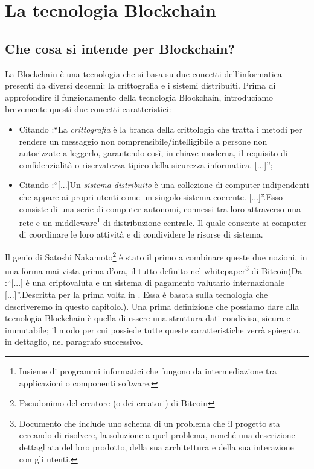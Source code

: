 
\chapter{La tecnologia Blockchain}\makeatletter{}\makeatother
\label{cap1}
\section{Che cosa si intende per Blockchain?}\label{Capitolo1.1}
La Blockchain è una tecnologia che si basa su due concetti dell'informatica presenti da diversi decenni: la crittografia e i sistemi distribuiti.
Prima di approfondire il funzionamento della tecnologia Blockchain, introduciamo brevemente questi due concetti caratteristici:

\begin{itemize}
    \item Citando \cite{crittografia_definizione}:“La \textit{crittografia} è la branca della crittologia che tratta i metodi per rendere un messaggio non comprensibile/intelligibile a persone non autorizzate a leggerlo, garantendo così, in chiave moderna, il requisito di confidenzialità o riservatezza tipico della sicurezza informatica. [...]”;
    
    \item Citando \cite{sistemi_distribuiti}:“[...]Un \textit{sistema distribuito} è una collezione di computer indipendenti che appare ai propri utenti come un singolo sistema coerente. [...]”.Esso consiste di una serie di computer autonomi, connessi tra loro attraverso una rete e un middleware\footnote{Insieme di programmi informatici che fungono da intermediazione tra applicazioni o componenti software.} di distribuzione centrale. Il quale consente ai computer di coordinare le loro attività e di condividere le risorse di sistema.
    
\end{itemize}

Il genio di Satoshi Nakamoto\footnote{Pseudonimo del creatore (o dei creatori) di Bitcoin} è stato il primo a combinare queste due nozioni, in una forma mai vista prima d'ora, il tutto definito nel whitepaper\footnote{Documento che include uno schema di un problema che il progetto sta cercando di risolvere, la soluzione a quel problema, nonché una descrizione dettagliata del loro prodotto, della sua architettura e della sua interazione con gli utenti.} di Bitcoin(Da \cite{bitcoin_definizione}:“[...] è una criptovaluta e un sistema di pagamento valutario internazionale [...]”.Descritta per la prima volta in \cite{bitcoin}. Essa è basata sulla tecnologia che descriveremo in questo capitolo.).
Una prima definizione che possiamo dare alla tecnologia Blockchain è quella di essere una struttura dati condivisa, sicura e immutabile; il modo per cui possiede tutte queste caratteristiche verrà spiegato, in dettaglio, nel paragrafo successivo.


